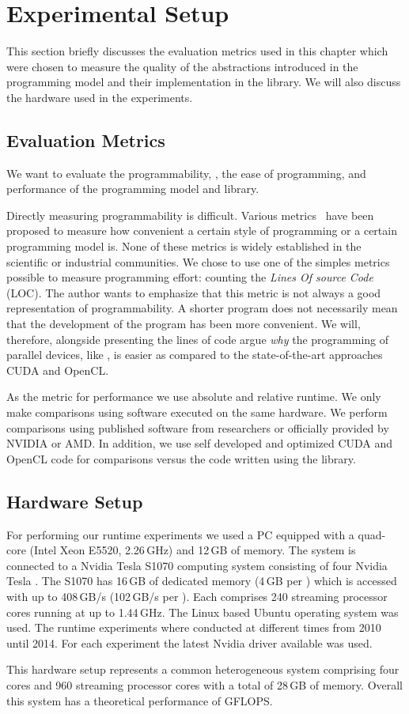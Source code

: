 \section{Experimental Setup}
\label{sec:skelcl:experimental_setup}
This section briefly discusses the evaluation metrics used in this chapter which were chosen to measure the quality of the abstractions introduced in the \SkelCL programming model and their implementation in the \SkelCL library.
We will also discuss the hardware used in the experiments.


\subsection{Evaluation Metrics}
We want to evaluate the programmability, \ie, the ease of programming, and performance of the \SkelCL programming model and library.

Directly measuring programmability is difficult.
Various metrics~\cite{} have been proposed to measure how convenient a certain style of programming or a certain programming model is.
None of these metrics is widely established in the scientific or industrial communities.
We chose to use one of the simples metrics possible to measure programming effort: counting the \emph{Lines Of source Code} (LOC).
The author wants to emphasize that this metric is not always a good representation of programmability.
A shorter program does not necessarily mean that the development of the program has been more convenient.
We will, therefore, alongside presenting the lines of code argue \emph{why} the programming of parallel devices, like \GPUs, is easier as compared to the state-of-the-art approaches CUDA and OpenCL.

As the metric for performance we use absolute and relative runtime.
We only make comparisons using software executed on the same hardware.
We perform comparisons using published software from researchers or officially provided by NVIDIA or AMD.
In addition, we use self developed and optimized CUDA and OpenCL code for comparisons versus the code written using the \SkelCL library.

\subsection{Hardware Setup}
For performing our runtime experiments we used a PC equipped with a quad-core \CPU (Intel Xeon E5520, 2.26\,GHz) and 12\,GB of memory.
The system is connected to a Nvidia Tesla S1070 computing system consisting of four Nvidia Tesla \GPUs.
The S1070 has 16\,GB of dedicated memory (4\,GB per \GPU) which is accessed with up to 408\,GB/s (102\,GB/s per \GPU).
Each \GPU comprises 240 streaming processor cores running at up to 1.44\,GHz.
The Linux based Ubuntu operating system was used.
The runtime experiments where conducted at different times from 2010 until 2014.
For each experiment the latest Nvidia \GPU driver available was used.

This hardware setup represents a common heterogeneous system comprising four \CPU cores and 960 \GPU streaming processor cores with a total of 28\,GB of memory.
Overall this system has a theoretical performance of  GFLOPS.

